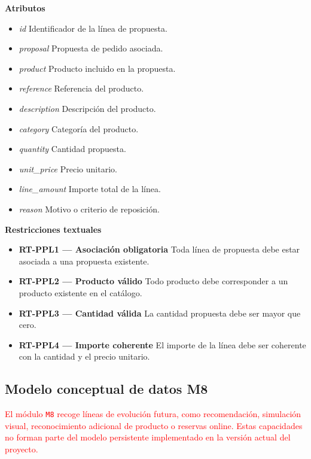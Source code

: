 \textbf{Atributos}

\begin{itemize}

      \item \textit{id}
            Identificador de la línea de propuesta.
      \item \textit{proposal}
            Propuesta de pedido asociada.
      \item \textit{product}
            Producto incluido en la propuesta.
      \item \textit{reference}
            Referencia del producto.
      \item \textit{description}
            Descripción del producto.
      \item \textit{category}
            Categoría del producto.
      \item \textit{quantity}
            Cantidad propuesta.
      \item \textit{unit\_price}
            Precio unitario.
      \item \textit{line\_amount}
            Importe total de la línea.
      \item \textit{reason}
            Motivo o criterio de reposición.

\end{itemize}

\textbf{Restricciones textuales}

\begin{itemize}

      \item \textbf{RT-PPL1 — Asociación obligatoria}
            Toda línea de propuesta debe estar asociada a una propuesta existente.
      \item \textbf{RT-PPL2 — Producto válido}
            Todo producto debe corresponder a un producto existente en el catálogo.

      \item \textbf{RT-PPL3 — Cantidad válida}
            La cantidad propuesta debe ser mayor que cero.
      \item \textbf{RT-PPL4 — Importe coherente}
            El importe de la línea debe ser coherente con la cantidad y el precio unitario.

\end{itemize}

\subsection{Modelo conceptual de datos M8}

\textcolor{red}{El módulo \texttt{M8} recoge líneas de evolución futura, como recomendación, simulación visual, reconocimiento adicional de producto o reservas online. Estas capacidades no forman parte del modelo persistente implementado en la versión actual del proyecto.}
